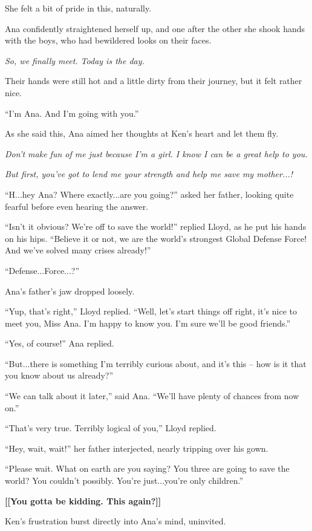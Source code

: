 \documentclass[
]{article}
\begin{document}
She felt a bit of pride in this, naturally.

Ana confidently straightened herself up, and one after the other she
shook hands with the boys, who had bewildered looks on their faces.

\emph{So, we finally meet. Today is the day.}

Their hands were still hot and a little dirty from their journey, but it
felt rather nice.

``I'm Ana. And I'm going with you.''

As she said this, Ana aimed her thoughts at Ken's heart and let them
fly.

\emph{Don't make fun of me just because I'm a girl. I know I can be a
great help to you.}

\emph{But first, you've got to lend me your strength and help me save my
mother...!}

``H...hey Ana? Where exactly...are you going?'' asked her father,
looking quite fearful before even hearing the answer.

``Isn't it obvious? We're off to save the world!'' replied Lloyd, as he
put his hands on his hips. ``Believe it or not, we are the world's
strongest Global Defense Force! And we've solved many crises already!''

``Defense...Force...?''

Ana's father's jaw dropped loosely.

``Yup, that's right,'' Lloyd replied. ``Well, let's start things off
right, it's nice to meet you, Miss Ana. I'm happy to know you. I'm sure
we'll be good friends.''

``Yes, of course!'' Ana replied.

``But...there is something I'm terribly curious about, and it's this --
how is it that you know about us already?''

``We can talk about it later,'' said Ana. ``We'll have plenty of chances
from now on.''

``That's very true. Terribly logical of you,'' Lloyd replied.

``Hey, wait, wait!'' her father interjected, nearly tripping over his
gown.

``Please wait. What on earth are you saying? You three are going to save
the world? You couldn't possibly. You're just...you're only children.''

\textbf{{[}{[}You gotta be kidding. This again?{]}{]}}

Ken's frustration burst directly into Ana's mind, uninvited.
\end{document}
